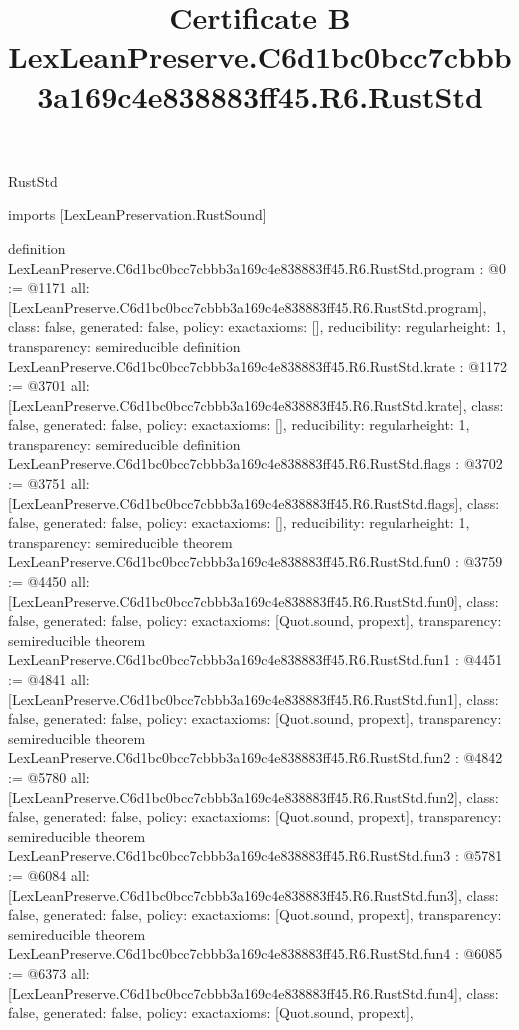 \begin{lexlean}{RustStd}
\title{Certificate B LexLeanPreserve.C6d1bc0bcc7cbbb3a169c4e838883ff45.R6.RustStd}
\begin{coremodule}
imports [LexLeanPreservation.RustSound]

definition LexLeanPreserve.C6d1bc0bcc7cbbb3a169c4e838883ff45.R6.RustStd.program : @0 := @1171 {
  all: [LexLeanPreserve.C6d1bc0bcc7cbbb3a169c4e838883ff45.R6.RustStd.program],
  class: false,
  generated: false,
  policy: exact{axioms: []},
  reducibility: regular{height: 1},
  transparency: semireducible
}
definition LexLeanPreserve.C6d1bc0bcc7cbbb3a169c4e838883ff45.R6.RustStd.krate : @1172 := @3701 {
  all: [LexLeanPreserve.C6d1bc0bcc7cbbb3a169c4e838883ff45.R6.RustStd.krate],
  class: false,
  generated: false,
  policy: exact{axioms: []},
  reducibility: regular{height: 1},
  transparency: semireducible
}
definition LexLeanPreserve.C6d1bc0bcc7cbbb3a169c4e838883ff45.R6.RustStd.flags : @3702 := @3751 {
  all: [LexLeanPreserve.C6d1bc0bcc7cbbb3a169c4e838883ff45.R6.RustStd.flags],
  class: false,
  generated: false,
  policy: exact{axioms: []},
  reducibility: regular{height: 1},
  transparency: semireducible
}
theorem LexLeanPreserve.C6d1bc0bcc7cbbb3a169c4e838883ff45.R6.RustStd.fun0 : @3759 := @4450 {
  all: [LexLeanPreserve.C6d1bc0bcc7cbbb3a169c4e838883ff45.R6.RustStd.fun0],
  class: false,
  generated: false,
  policy: exact{axioms: [Quot.sound, propext]},
  transparency: semireducible
}
theorem LexLeanPreserve.C6d1bc0bcc7cbbb3a169c4e838883ff45.R6.RustStd.fun1 : @4451 := @4841 {
  all: [LexLeanPreserve.C6d1bc0bcc7cbbb3a169c4e838883ff45.R6.RustStd.fun1],
  class: false,
  generated: false,
  policy: exact{axioms: [Quot.sound, propext]},
  transparency: semireducible
}
theorem LexLeanPreserve.C6d1bc0bcc7cbbb3a169c4e838883ff45.R6.RustStd.fun2 : @4842 := @5780 {
  all: [LexLeanPreserve.C6d1bc0bcc7cbbb3a169c4e838883ff45.R6.RustStd.fun2],
  class: false,
  generated: false,
  policy: exact{axioms: [Quot.sound, propext]},
  transparency: semireducible
}
theorem LexLeanPreserve.C6d1bc0bcc7cbbb3a169c4e838883ff45.R6.RustStd.fun3 : @5781 := @6084 {
  all: [LexLeanPreserve.C6d1bc0bcc7cbbb3a169c4e838883ff45.R6.RustStd.fun3],
  class: false,
  generated: false,
  policy: exact{axioms: [Quot.sound, propext]},
  transparency: semireducible
}
theorem LexLeanPreserve.C6d1bc0bcc7cbbb3a169c4e838883ff45.R6.RustStd.fun4 : @6085 := @6373 {
  all: [LexLeanPreserve.C6d1bc0bcc7cbbb3a169c4e838883ff45.R6.RustStd.fun4],
  class: false,
  generated: false,
  policy: exact{axioms: [Quot.sound, propext]},
}
\end{coremodule}
\end{lexlean}
